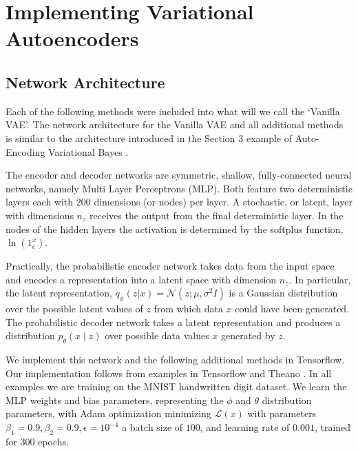 \documentclass{article} %
\renewcommand{\L}{\mathcal{L}}
\begin{document}
\section{Implementing Variational Autoencoders}
\subsection{Network Architecture}
Each of the following methods were included into what will we call the `Vanilla VAE'. The network architecture for the Vanilla VAE and all additional methods is similar to the architecture introduced in the Section $3$ example of Auto-Encoding Variational Bayes \cite{Kingma2013}.
\par The encoder and decoder networks are symmetric, shallow, fully-connected neural networks, namely Multi Layer Perceptrons (MLP). Both feature two deterministic layers each with $200$ dimensions (or nodes) per layer. A stochastic, or latent, layer with dimensions $n_z$ receives the output from the final deterministic layer.  In the nodes of the hidden layers the activation is determined by the softplus function, $\ln{\left(1_e^x\right)}$.
\par Practically, the probabilistic encoder network takes data from the input space and encodes a representation into a latent space with dimension $n_z$. In particular, the latent representation, $q_\phi(z|x)=\mathcal{N}(z;\mu,\sigma^2 I)$ is a Gaussian distribution over the possible latent values of $z$ from which data $x$ could have been generated. The probabilistic decoder network takes a latent representation and produces a distribution ${p_\theta(x\mid z)}$ over possible data values $x$ generated by $z$.
\par We implement this network and the following additional methods in Tensorflow. Our implementation follows from examples in Tensorflow and Theano \cite{Sonderby2016,Metzen2015,Ahuja}. In all examples we are training on the MNIST handwritten digit dataset. We learn the MLP weights and bias parameters, representing the $\phi$ and $\theta$ distribution parameters, with Adam optimization minimizing $\L(x)$ with parameters $\beta_1 = 0.9, \beta_2 = 0.9, \epsilon = 10^{-4}$ a batch size of $100$, and learning rate of $0.001$, trained for $300$ epochs.
\end{document}
